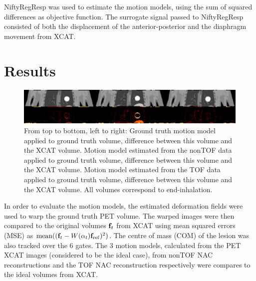 \documentclass[journal]{IEEEtran}
\begin{document}
NiftyRegResp was used to estimate the motion models, using the sum of squared differences as objective function. The surrogate signal passed to NiftyRegResp consisted of both the displacement of the anterior-posterior and the  diaphragm movement from XCAT.

\section{Results}
\begin{figure}
    \centering
    \includegraphics[scale=0.35]{figures/figure.png}
    \caption{From top to bottom, left to right: Ground truth motion model applied to ground truth volume, difference between this volume and the XCAT volume. Motion model estimated from the nonTOF data applied to ground truth volume, difference between this volume and the XCAT volume. Motion model estimated from the TOF data applied to ground truth volume, difference between this volume and the XCAT volume. All volumes correspond to end-inhalation.}
    \label{fig:figure}
\end{figure}

In order to evaluate the motion models, the estimated deformation fields were used to warp the ground truth PET volume. The warped images were then compared to the original volumes $\bold{f}_t$ from XCAT using mean squared errors (MSE) as $\mathrm{mean}((\bold{f}_t-W(\alpha_t) \bold{f}_\mathrm{ref})^2)$. The centre of mass (COM) of the lesion was also tracked over the $6$ gates. The $3$ motion models, calculated from the PET XCAT images (considered to be the ideal case), from nonTOF NAC reconstructions and the TOF NAC reconstruction respectively were compares to the ideal volumes from XCAT.
\end{document}
